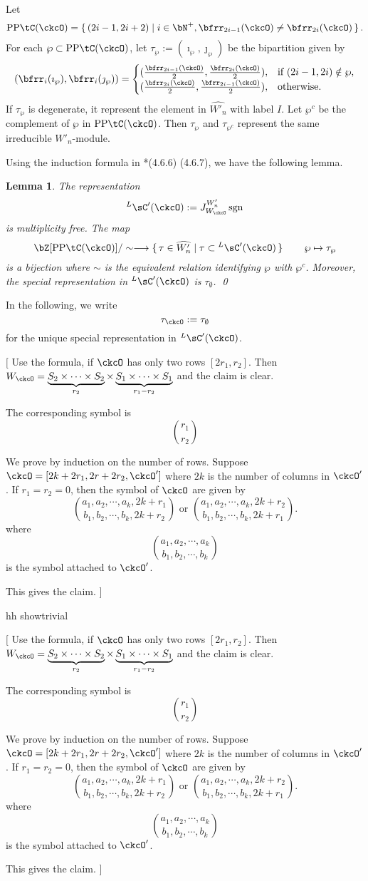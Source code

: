 \documentclass[12pt,a4paper]{amsart}
\newcommand{\trivial}[2][]{\if\relax\detokenize{#1}\relax
  {%
      \color{orange} \vspace{0em} $[$  #2 $]$
      \color{black}
  }
  \else
\ifx#1h
\ifcsname showtrivial\endcsname
{%
    \color{orange} \vspace{0em}  $[$ #2 $]$
    \color{black}
}
\fi
\else {\red Wrong argument!} \fi
\fi
}
\newcommand{\sgn}{\operatorname{sgn}}
\numberwithin{equation}{section}
\newtheorem{lem}[thm]{Lemma}
\theoremstyle{remark}
\def\PP{\mathrm{PP}}
\begin{document}
\def\PPtC{\PP{\tC}}
 Let
 \[
  \PPtC(\ckcO) = \set{(2i-1,2i+2)|i\in \bN^+, \bfrr_{2i-1}(\ckcO)\neq \bfrr_{2i}(\ckcO)}.
 \]
  For each $\wp\subset \PPtC(\ckcO)$, let $\tau_\wp := (\imath_\wp,\jmath_\wp)$ be the bipartition
  given by
  \[
    (\bfrr_i(\imath_\wp),\bfrr_i(\jmath_\wp)) =\begin{cases}
      (\frac{\bfrr_{2i-1}(\ckcO)}{2}, \frac{\bfrr_{2i}(\ckcO)}{2}),   & \text{if } (2i-1,2i)\notin \wp, \\
      (\frac{\bfrr_{2i}(\ckcO)}{2}, \frac{\bfrr_{2i-1}(\ckcO)}{2}), & \text{otherwise.}
    \end{cases}
  \]
  If $\tau_\wp$ is degenerate, it represent the element in $\widehat{W'_n}$
  with label $I$.
  Let $\wp^c$ be the complement of $\wp$ in $\PPtC(\ckcO)$.
  Then $\tau_\wp$ and $\tau_{\wp^c}$ represent the same irreducible $W'_n$-module.

  \def\LCC{{}^L\sC'}
Using the induction formula in \cite{L}*{(4.6.6) (4.6.7)}, we have the following lemma.
\begin{lem}
The representation
\[
  \LCC(\ckcO) :=J_{W_\ckcO}^{W'_n} \sgn
\]
is multiplicity free.
The map
\[
  \bZ[\PPtC(\ckcO)]/\sim \longrightarrow \set{\tau\in \widehat{W'_n}| \tau\subset \LCC(\ckcO)}
  \qquad \wp \mapsto \tau_\wp
\]
is a bijection where $\sim$ is the equivalent relation identifying $\wp$ with $\wp^c$.
Moreover, the special representation in $\LCC(\ckcO)$ is $\tau_\emptyset$.
\qed
\end{lem}

In the following, we write
\[
\tau_{\ckcO}:=\tau_\emptyset
\]
for the unique special
representation in $\LCC(\ckcO)$.

\trivial[h]{
 Use the formula, if $\ckcO$ has only two rows $[2r_1,r_2]$.
 Then $W_{\ckcO} = \underbrace{S_2\times \cdots \times S_2}_{r_2} \times
 \underbrace{ S_1 \times \cdots \times S_1}_{r_1-r_2}$ and the claim is clear.

 The corresponding symbol is
 \[
  \binom{r_1}{r_2}
 \]

 We prove by induction on the number of rows.
 Suppose $\ckcO  = [2k+2r_1, 2r+2r_2, \ckcO'] $ where $2k$ is the number of columns in $\ckcO'$.
 If $r_1=r_2 =0$, then
 the symbol of $\ckcO$ are given by
 \[
  \binom{a_1,a_2, \cdots, a_k, 2k+r_1}{b_1, b_2, \cdots, b_k, 2k+r_2 }
  \text{ or }
  \binom{a_1,a_2, \cdots, a_k, 2k+r_2}{b_1, b_2, \cdots, b_k, 2k+r_1 }.
 \]
where
\[
  \binom{a_1,a_2, \cdots, a_k}{b_1, b_2, \cdots, b_k}
\]
is the symbol attached to $\ckcO'$.

This gives the claim.
}
\end{document}
